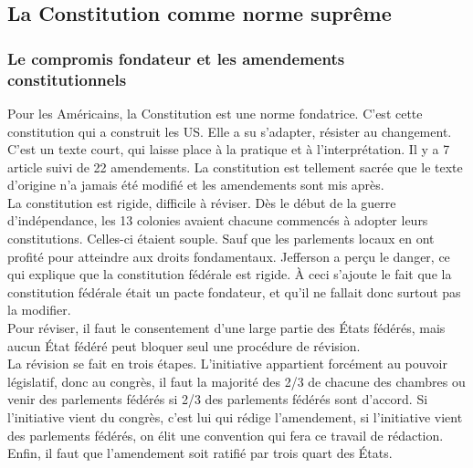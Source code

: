 \documentclass[10pt, a4paper, openany]{book}
\begin{document}
\subsection{La Constitution comme norme suprême}

\subsubsection{Le compromis fondateur et les amendements constitutionnels}

Pour les Américains, la Constitution est une norme fondatrice. C'est cette constitution qui a construit les US. Elle a su s'adapter, résister au changement. C'est un texte court, qui laisse place à la pratique et à l'interprétation. Il y a 7 article suivi de 22 amendements. La constitution est tellement sacrée que le texte d'origine n'a jamais été modifié et les amendements sont mis après. \\
La constitution est rigide, difficile à réviser. Dès le début de la guerre d'indépendance, les 13 colonies avaient chacune commencés à adopter leurs constitutions. Celles-ci étaient souple. Sauf que les parlements locaux en ont profité pour atteindre aux droits fondamentaux. Jefferson a perçu le danger, ce qui explique que la constitution fédérale est rigide. À ceci s'ajoute le fait que la constitution fédérale était un pacte fondateur, et qu'il ne fallait donc surtout pas la modifier. \\
Pour réviser, il faut le consentement d'une large partie des États fédérés, mais aucun État fédéré peut bloquer seul une procédure de révision. \\
La révision se fait en trois étapes. L'initiative appartient forcément au pouvoir législatif, donc au congrès, il faut la majorité des 2/3 de chacune des chambres ou venir des parlements fédérés si 2/3 des parlements fédérés sont d'accord. Si l'initiative vient du congrès, c'est lui qui rédige l'amendement, si l'initiative vient des parlements fédérés, on élit une convention qui fera ce travail de rédaction. Enfin, il faut que l'amendement soit ratifié par trois quart des États. 
\end{document}
